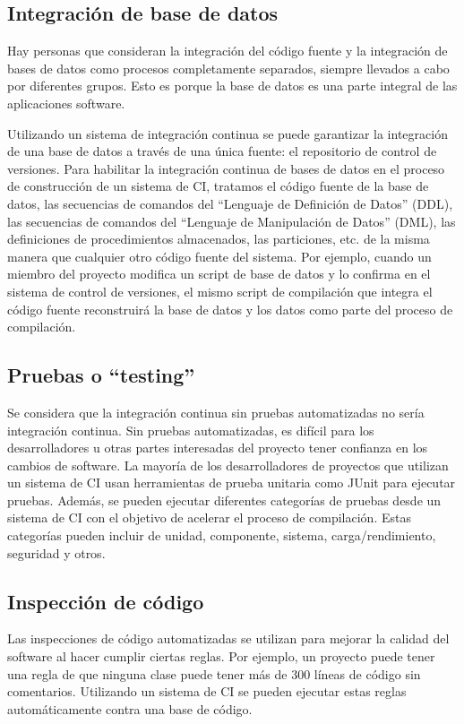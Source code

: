 \subsection{Integración de base de datos}
Hay personas que consideran la integración del código fuente y la integración de bases de datos como procesos completamente separados, siempre llevados a cabo por diferentes grupos. Esto es porque la base de datos es una parte integral de las aplicaciones software. 

Utilizando un sistema de integración continua se puede garantizar la integración de una base de datos a través de una única fuente: el repositorio de control de versiones. Para habilitar la integración continua de bases de datos en el proceso de construcción de un sistema de CI, tratamos el código fuente de la base de datos, las secuencias de comandos del ``Lenguaje de Definición de Datos'' (DDL), las secuencias de comandos del ``Lenguaje de Manipulación de Datos'' (DML), las definiciones de procedimientos almacenados, las particiones, etc. de la misma manera que cualquier otro código fuente del sistema. Por ejemplo, cuando un miembro del proyecto modifica un script de base de datos y lo confirma en el sistema de control de versiones, el mismo script de compilación que integra el código fuente reconstruirá la base de datos y los datos como parte del proceso de compilación.

\subsection{Pruebas o “testing”}
Se considera que la integración continua sin pruebas automatizadas no sería integración continua. Sin pruebas automatizadas, es difícil para los desarrolladores u otras partes interesadas del proyecto tener confianza en los cambios de software. La mayoría de los desarrolladores de proyectos que utilizan un sistema de CI usan herramientas de prueba unitaria como JUnit para ejecutar pruebas. Además, se pueden ejecutar diferentes categorías de pruebas desde un sistema de CI con el objetivo de acelerar el proceso de compilación. Estas categorías pueden incluir de unidad, componente, sistema, carga/rendimiento, seguridad y otros.

\subsection{Inspección de código}
Las inspecciones de código automatizadas se utilizan para mejorar la calidad del software al hacer cumplir ciertas reglas. Por ejemplo, un proyecto puede tener una regla de que ninguna clase puede tener más de 300 líneas de código sin comentarios. Utilizando un sistema de CI se pueden ejecutar estas reglas automáticamente contra una base de código.

